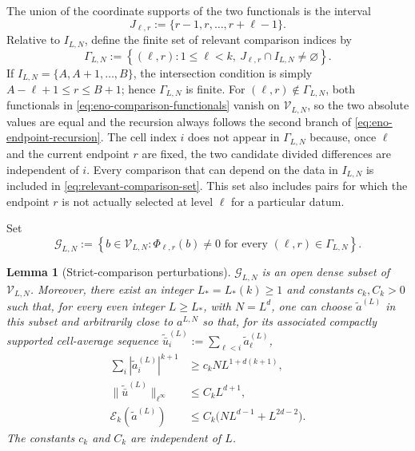 \documentclass[11pt]{amsart}
\theoremstyle{plain}
\newtheorem{lemma}[theorem]{Lemma}
\theoremstyle{definition}
\theoremstyle{remark}
\numberwithin{equation}{section}
\theoremstyle{plain}
\begin{document}
The union of the coordinate supports of the two functionals is the interval
\begin{equation}\label{eq:eno-comparison-window}
	J_{\ell,r}:=\{r-1,r,\ldots,r+\ell-1\}.
\end{equation}
Relative to $I_{L,N}$, define the finite set of relevant comparison indices
by
\begin{equation}\label{eq:relevant-comparison-set}
	\Gamma_{L,N}
	:=\left\{(\ell,r):1\le\ell<k,\ 
	J_{\ell,r}\cap I_{L,N}\ne\varnothing\right\}.
\end{equation}
If $I_{L,N}=\{A,A+1,\ldots,B\}$, the intersection condition is simply
$A-\ell+1\le r\le B+1$; hence $\Gamma_{L,N}$ is finite.
For $(\ell,r)\notin\Gamma_{L,N}$, both functionals in
\eqref{eq:eno-comparison-functionals} vanish on $\mathcal V_{L,N}$, so the
two absolute values are equal and the recursion always follows the second
branch of \eqref{eq:eno-endpoint-recursion}.  The cell index $i$ does
not appear in $\Gamma_{L,N}$ because, once $\ell$ and the current endpoint
$r$ are fixed, the two candidate divided differences are independent of
$i$.  Every comparison that can depend on the data in $I_{L,N}$ is included
in \eqref{eq:relevant-comparison-set}.  This set also includes pairs for
which the endpoint $r$ is not actually selected at level $\ell$ for a
particular datum.

Set
\begin{equation}\label{eq:strict-comparison-set}
	\mathcal G_{L,N}
	:=\left\{b\in\mathcal V_{L,N}:
	\Phi_{\ell,r}(b)\ne0
	\text{ for every }(\ell,r)\in\Gamma_{L,N}\right\}.
\end{equation}

\begin{lemma}[Strict-comparison perturbations]
	\label{lem:strict-perturbation}
	$\mathcal G_{L,N}$ is an open dense subset of $\mathcal V_{L,N}$.
	Moreover, there exist an integer $L_*=L_*(k)\ge1$ and constants
	$c_k,C_k>0$ such that, for every even integer $L\ge L_*$, with $N=L^d$,
	one can choose $\widetilde a^{(L)}$ in this
	subset and arbitrarily close to $a^{L,N}$ so that, for its associated
	compactly supported cell-average sequence
	$\widetilde{\bar u}^{(L)}_i:=\sum_{\ell<i}\widetilde a^{(L)}_\ell$,
	\begin{align}
		\sum_i|\widetilde a_i^{(L)}|^{k+1}
		&\ge c_kNL^{1+d(k+1)},
		\label{eq:perturbed-euler-bulk}\\
		\|\widetilde{\bar u}^{(L)}\|_{\ell^\infty}
		&\le C_kL^{d+1},
		\label{eq:perturbed-euler-primitive}\\
		\mathcal E_k(\widetilde a^{(L)})
		&\le C_k\bigl(NL^{d-1}+L^{2d-2}\bigr).
		\label{eq:perturbed-euler-source}
	\end{align}
	The constants $c_k$ and $C_k$ are independent of $L$.
\end{lemma}
\end{document}
